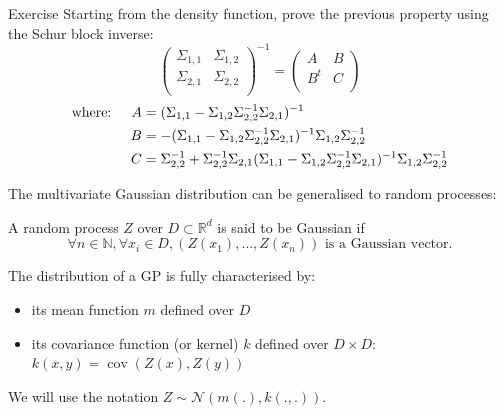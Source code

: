 \documentclass{beamer}
\DeclareMathOperator*{\Cov}{cov}
\begin{document}
\begin{frame}{}
\begin{exampleblock}{Exercise}
	Starting from the density function, prove the previous property using the Schur block inverse:
\begin{equation*}
\begin{pmatrix}
	\Sigma_{1,1} & \Sigma_{1,2}\\
	\Sigma_{2,1} & \Sigma_{2,2}\\
\end{pmatrix}^{-1} = 
\begin{pmatrix}
	A & B\\
	B^t & C\\
\end{pmatrix}
\end{equation*}
\begin{equation*}
\begin{split}
 \text{where: \quad} A &= (\Sigma_{1,1} - \Sigma_{1,2} \Sigma_{2,2}^{-1} \Sigma_{2,1})^{-1}\\
 B &= -(\Sigma_{1,1} - \Sigma_{1,2} \Sigma_{2,2}^{-1} \Sigma_{2,1})^{-1}\Sigma_{1,2}\Sigma_{2,2}^{-1}\\
 C &= \Sigma_{2,2}^{-1} + \Sigma_{2,2}^{-1} \Sigma_{2,1} (\Sigma_{1,1} -\Sigma_{1,2} \Sigma_{2,2}^{-1} \Sigma_{2,1})^{-1}\Sigma_{1,2}\Sigma_{2,2}^{-1}
\end{split}
\end{equation*}
\end{exampleblock}
\end{frame}


\begin{frame}{}
The multivariate Gaussian distribution can be generalised to random processes: 
\begin{definition}
A random process $Z$ over $D \subset \mathds{R}^d$ is said to be Gaussian if 
\begin{equation*}
\forall n \in \mathds{N}, \forall x_i \in D, (Z(x_1),\dots,Z(x_n)) \text{  is a Gaussian vector}.
\end{equation*} 
\end{definition}
The distribution of a GP is fully characterised by:
\begin{itemize}
	\item its mean function $m$ defined over $D$ 
	\item its covariance function (or kernel) $k$ defined over $D \times D$: $k(x,y) = \Cov(Z(x),Z(y))$
\end{itemize}
We will use the notation $Z \sim \mathcal{N}(m(.),k(.,.))$.
\end{frame}
\end{document}
